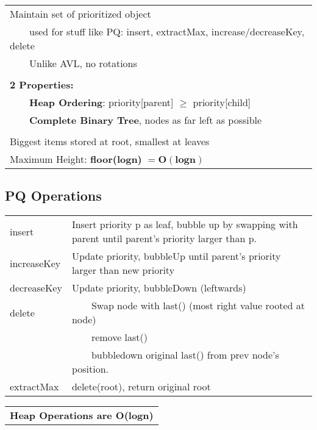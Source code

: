 \documentclass{article}
\newcommand{\tabitem}{~~\llap{\textbullet}~~}
\begin{document}
    \begin{tabular}{l}
        Maintain set of prioritized object\\
        \tabitem used for stuff like PQ: insert, extractMax, increase/decreaseKey, delete\\
        \tabitem Unlike AVL, no rotations\\\\
        \textbf{2 Properties: }\\
        \tabitem \textbf{Heap Ordering}: priority[parent] $\geq$ priority[child]\\
        \tabitem \textbf{Complete Binary Tree}, nodes as far left as possible\\\\
        Biggest items stored at root, smallest at leaves\\
        Maximum Height: \textbf{floor(logn)} $\bm{= O(logn)}$\\
    \end{tabular}

    \subsection{PQ Operations}

    \begin{tabular}{ll}
        insert & Insert priority p as leaf, bubble up by swapping with parent until parent's priority larger than p.\\
        increaseKey & Update priority, bubbleUp until parent's priority larger than new priority\\
        decreaseKey & Update priority, bubbleDown (leftwards)\\
        delete & \tabitem Swap node with last() (most right value rooted at node)\\
        & \tabitem remove last()\\
        & \tabitem bubbledown original last() from prev node's position.\\
        extractMax & delete(root), return original root\\
    \end{tabular}
    \begin{tabular}{l}
        \textbf{Heap Operations are O(logn)}\\
    \end{tabular}
\end{document}
